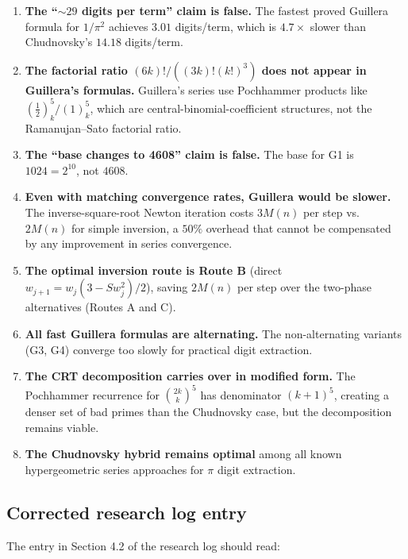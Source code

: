 \documentclass[11pt]{article}
\begin{document}
\begin{enumerate}
\item \textbf{The ``${\sim}29$ digits per term'' claim is false.} The fastest proved Guillera formula for $1/\pi^2$ achieves $3.01$ digits/term, which is $4.7\times$ slower than Chudnovsky's $14.18$ digits/term.

\item \textbf{The factorial ratio $(6k)!/((3k)!(k!)^3)$ does not appear in Guillera's formulas.} Guillera's series use Pochhammer products like $(\tfrac{1}{2})_k^5 / (1)_k^5$, which are central-binomial-coefficient structures, not the Ramanujan--Sato factorial ratio.

\item \textbf{The ``base changes to 4608'' claim is false.} The base for G1 is $1024 = 2^{10}$, not $4608$.

\item \textbf{Even with matching convergence rates, Guillera would be slower.} The inverse-square-root Newton iteration costs $3M(n)$ per step vs.\ $2M(n)$ for simple inversion, a $50\%$ overhead that cannot be compensated by any improvement in series convergence.

\item \textbf{The optimal inversion route is Route B} (direct $w_{j+1} = w_j(3 - Sw_j^2)/2$), saving $2M(n)$ per step over the two-phase alternatives (Routes A and C).

\item \textbf{All fast Guillera formulas are alternating.} The non-alternating variants (G3, G4) converge too slowly for practical digit extraction.

\item \textbf{The CRT decomposition carries over in modified form.} The Pochhammer recurrence for $\binom{2k}{k}^5$ has denominator $(k+1)^5$, creating a denser set of bad primes than the Chudnovsky case, but the decomposition remains viable.

\item \textbf{The Chudnovsky hybrid remains optimal} among all known hypergeometric series approaches for $\pi$ digit extraction.
\end{enumerate}

\subsection{Corrected research log entry}

The entry in Section 4.2 of the research log should read:
\end{document}
